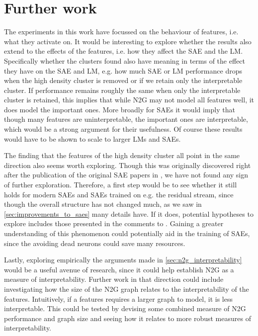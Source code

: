 \section{Further work}
The experiments in this work have focussed on the behaviour of features, i.e. what they activate on.
It would be interesting to explore whether the results also extend to the effects of the features, i.e. how they affect the SAE and the LM.
Specifically whether the clusters found also have meaning in terms of the effect they have on the SAE and LM, e.g. how much SAE or LM performance drops when the high density cluster is removed or if we retain only the interpretable cluster.
If performance remains roughly the same when only the interpretable cluster is retained, this implies that while N2G may not model all features well, it does model the important ones.
More broadly for SAEs it would imply that though many features are uninterpretable, the important ones are interpretable, which would be a strong argument for their usefulness.
Of course these results would have to be shown to scale to larger LMs and SAEs.

The finding that the features of the high density cluster all point in the same direction also seems worth exploring.
Though this was originally discovered right after the publication of the original SAE papers in \textcite{nanda_open_2023}, we have not found any sign of further exploration.
Therefore, a first step would be to see whether it still holds for modern SAEs and SAEs trained on e.g. the residual stream, since though the overall structure has not changed much, as we saw in \autoref{sec:improvements_to_saes} many details have.
If it does, potential hypotheses to explore includes those presented in the comments to \textcite{nanda_open_2023}.
Gaining a greater understanding of this phenomenon could potentially aid in the training of SAEs, since the avoiding dead neurons could save many resources.

Lastly, exploring empirically the arguments made in \autoref{sec:n2g_interpretability} would be a useful avenue of research, since it could help establish N2G as a measure of interpretability.
Further work in that direction could include investigating how the size of the N2G graph relates to the interpretability of the features.
Intuitively, if a features requires a larger graph to model, it is less interpretable.
This could be tested by devising some combined measure of N2G performance and graph size and seeing how it relates to more robust measures of interpretability.
